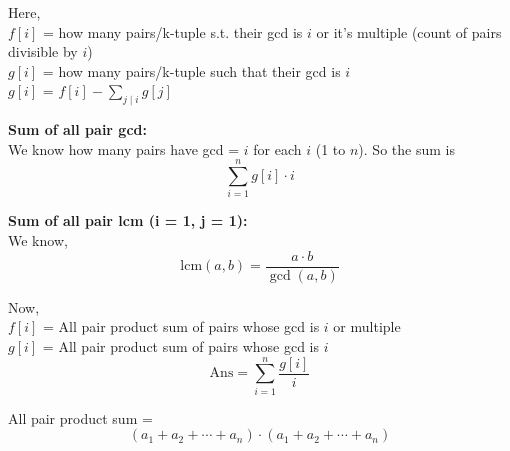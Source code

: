 Here, \\

$f[i]$ = how many pairs/k-tuple s.t. their gcd is $i$ or it’s multiple (count of pairs divisible by $i$) \\ 
$g[i]$ = how many pairs/k-tuple such that their gcd is $i$ \\ 
$g[i]$ = $f[i] - \sum_{j \mid i} g[j]$ \\

\medskip

\textbf{Sum of all pair gcd:} \\

We know how many pairs have gcd = $i$ for each $i$ (1 to $n$). So the sum is  
\[
\sum_{i=1}^{n} g[i] \cdot i
\]

\medskip
\medskip

\textbf{Sum of all pair lcm (i = 1, j = 1):} \\

We know,
\[
\text{lcm}(a, b) = \frac{a \cdot b}{\gcd(a,b)}
\]

\medskip

Now, \\

$f[i]$ = All pair product sum of pairs whose gcd is $i$ or multiple \\ 
$g[i]$ = All pair product sum of pairs whose gcd is $i$ \\

\[
\text{Ans} = \sum_{i=1}^{n} \frac{g[i]}{i}
\]

\medskip
\medskip

All pair product sum = 
\[
(a_1 + a_2 + \cdots + a_n) \cdot (a_1 + a_2 + \cdots + a_n)
\]

\medskip

